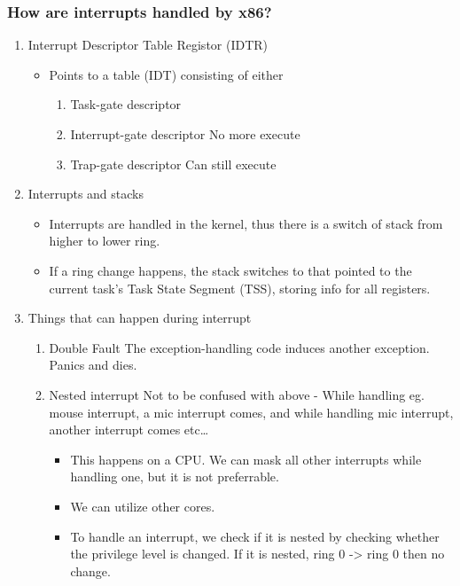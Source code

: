 \documentclass[11pt]{article}
\begin{document}
\subsubsection{How are interrupts handled by x86?}
\label{sec:orgd265134}
\begin{enumerate}
\item Interrupt Descriptor Table Registor (IDTR)
\label{sec:orgb4f840b}
\begin{itemize}
\item Points to a table (IDT) consisting of either
\begin{enumerate}
\item Task-gate descriptor
\item Interrupt-gate descriptor
No more execute
\item Trap-gate descriptor
Can still execute
\end{enumerate}
\end{itemize}
\item Interrupts and stacks
\label{sec:org7f5709a}
\begin{itemize}
\item Interrupts are handled in the kernel, thus there is a switch of stack from
higher to lower ring.
\item If a ring change happens, the stack switches to that pointed to the current
task's Task State Segment (TSS), storing info for all registers.
\end{itemize}
\item Things that can happen during interrupt
\label{sec:org9b6c5ed}
\begin{enumerate}
\item Double Fault
\label{sec:org3f43c6f}
The exception-handling code induces another exception. Panics and dies.
\item Nested interrupt
\label{sec:org5a810c8}
Not to be confused with above - While handling eg. mouse interrupt, a mic
interrupt comes, and while handling mic interrupt, another interrupt comes etc\ldots{}
\begin{itemize}
\item This happens on a CPU. We can mask all other interrupts while handling one,
but it is not preferrable.
\item We can utilize other cores.
\item To handle an interrupt, we check if it is nested by checking whether the
privilege level is changed. If it is nested, ring 0 -> ring 0 then no change.
\end{itemize}
\end{enumerate}
\end{enumerate}
\end{document}
